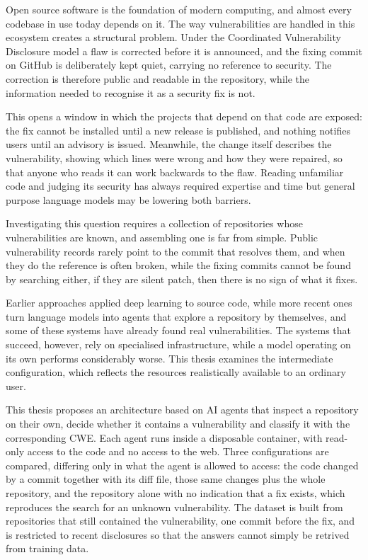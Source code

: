 
Open source software is the foundation of modern computing, and almost every codebase
in use today depends on it. The way vulnerabilities are handled in this ecosystem
creates a structural problem. Under the Coordinated Vulnerability Disclosure model a
flaw is corrected before it is announced, and the fixing commit on GitHub is deliberately kept
quiet, carrying no reference to security. The correction is therefore public and
readable in the repository, while the information needed to recognise it as a security
fix is not.

This opens a window in which the projects that depend on that code are exposed: 
the fix cannot be installed until a new release is published, and nothing
notifies users until an advisory is issued. Meanwhile, the change itself describes the
vulnerability, showing which lines were wrong and how they were repaired, so that
anyone who reads it can work backwards to the flaw. 
Reading unfamiliar code and judging its security has always required expertise and time but 
general purpose language models may be lowering both barriers. 

Investigating this question requires a collection of repositories whose vulnerabilities
are known, and assembling one is far from simple. 
Public vulnerability records rarely
point to the commit that resolves them, and when they do the reference is often broken,
while the fixing commits cannot be found by searching either, if they are silent patch, then
there is no sign of what it fixes.

Earlier approaches applied deep learning to source code, while more recent ones 
turn language models into agents that explore a
repository by themselves, and some of these systems have already found real
vulnerabilities. The systems that succeed, however, rely on specialised infrastructure, 
while a model operating on its own performs considerably worse. This thesis examines the 
intermediate configuration, which reflects the resources realistically available to an ordinary user.

This thesis proposes an architecture based on AI agents that inspect a repository on
their own, decide whether it contains a vulnerability and classify it with the
corresponding CWE. Each agent runs inside a disposable container, with read-only access
to the code and no access to the web. Three configurations are compared, differing only
in what the agent is allowed to access: the code changed by a commit together with its
diff file, those same changes plus the whole repository, and the repository alone with no
indication that a fix exists, which reproduces the search for an unknown vulnerability.
The dataset is built from repositories that still contained the
vulnerability, one commit before the fix, and is restricted to recent disclosures so
that the answers cannot simply be retrived from training data.

